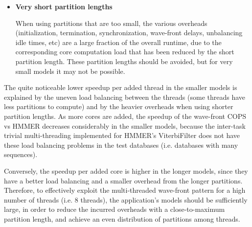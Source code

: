 \begin{itemize}
\item \textbf{Very short partition lengths}

When using partitions that are too small, the various overheads (initialization, termination, synchronization, wave-front delays,  unbalancing idle times, etc) are a large fraction of the overall runtime, due to the corresponding core computation load that has been reduced by the short partition length. These partition lengths should be avoided, but for very small models it may not be possible.


\end{itemize}
	
The quite noticeable lower speedup per added thread in the smaller models is explained by the uneven load balancing between the threads (some threads have less partitions to compute) and by the heavier overheads when using shorter partition lengths. As more cores are added, the speedup of the wave-front COPS vs HMMER decreases considerably in the smaller models, because the inter-task trivial multi-threading implemented for HMMER's ViterbiFilter does not have these load balancing problems in the test databases (i.e. databases with many sequences).

Conversely, the speedup per added core is higher in the longer models, since they have a better load balancing and a smaller overhead from the longer partitions. Therefore, to effectively exploit the multi-threaded wave-front pattern for a high number of threads (i.e. 8 threads), the application's models should be sufficiently large, in order to reduce the incurred overheads with a close-to-maximum partition length, and achieve an even distribution of partitions among threads.



\clearpage





